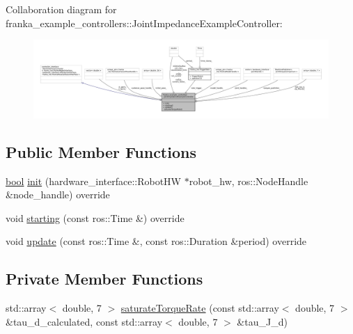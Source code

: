 Collaboration diagram for franka\+\_\+example\+\_\+controllers\+:\+:Joint\+Impedance\+Example\+Controller\+:
\nopagebreak
\begin{figure}[H]
\begin{center}
\leavevmode
\includegraphics[width=350pt]{classfranka__example__controllers_1_1JointImpedanceExampleController__coll__graph}
\end{center}
\end{figure}
\subsection*{Public Member Functions}
\begin{DoxyCompactItemize}
\item 
\hyperlink{classbool}{bool} \hyperlink{classfranka__example__controllers_1_1JointImpedanceExampleController_a8163440bff59a3067be1d47e4b3c3c84}{init} (hardware\+\_\+interface\+::\+Robot\+HW $\ast$robot\+\_\+hw, ros\+::\+Node\+Handle \&node\+\_\+handle) override
\item 
void \hyperlink{classfranka__example__controllers_1_1JointImpedanceExampleController_a968df72e561b1c35c4c406eb5cd79011}{starting} (const ros\+::\+Time \&) override
\item 
void \hyperlink{classfranka__example__controllers_1_1JointImpedanceExampleController_afd7edb0e2600dd7732b0bf00e14d41c2}{update} (const ros\+::\+Time \&, const ros\+::\+Duration \&period) override
\end{DoxyCompactItemize}
\subsection*{Private Member Functions}
\begin{DoxyCompactItemize}
\item 
std\+::array$<$ double, 7 $>$ \hyperlink{classfranka__example__controllers_1_1JointImpedanceExampleController_a246799d505d7ebedb1c75d8e9f251a01}{saturate\+Torque\+Rate} (const std\+::array$<$ double, 7 $>$ \&tau\+\_\+d\+\_\+calculated, const std\+::array$<$ double, 7 $>$ \&tau\+\_\+\+J\+\_\+d)
\end{DoxyCompactItemize}
